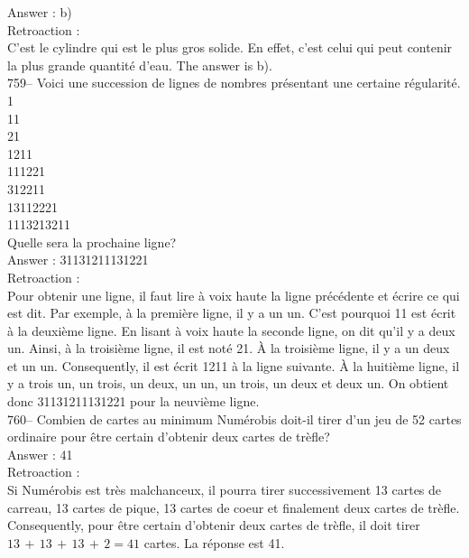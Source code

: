 ﻿\documentclass[letterpaper, 12pt]{article}
\begin{document}
Answer : b)\\

Retroaction : \\
C'est le cylindre qui est le plus gros solide. En effet, c'est celui qui
peut contenir la plus grande quantit\'e d'eau.  The answer is b).\\

759-- Voici une succession de lignes de nombres pr\'esentant une certaine
r\'egularit\'e.  \\
1\\
11\\
21\\
1211\\
111221\\
312211\\
13112221\\
1113213211\\

Quelle sera la prochaine ligne?\\

Answer : 31131211131221\\

Retroaction : \\
Pour obtenir une ligne, il faut lire \`a voix haute la ligne pr\'ec\'edente
et \'ecrire ce qui est dit.  Par exemple, \`a la premi\`ere ligne, il y a un
un.  C'est pourquoi 11 est \'ecrit \`a la deuxi\`eme ligne. En lisant \`a
voix haute la seconde ligne, on dit qu'il y a deux un.  Ainsi, \`a la
troisi\`eme ligne, il est not\'e 21.  \`A la troisi\`eme ligne, il y a un
deux et un un.  Consequently, il est \'ecrit 1211 \`a la ligne suivante.
  \`A la huiti\`eme ligne, il y a trois un, un trois, un deux, un un, un
trois, un deux et deux un. On obtient donc 31131211131221 pour la neuvi\`eme
ligne.\\


760--  Combien de cartes au minimum Num\'erobis doit-il tirer d'un jeu de 52
cartes ordinaire pour \^etre certain d'obtenir deux cartes de tr\`efle?\\

Answer : 41\\

Retroaction : \\
Si Num\'erobis est tr\`es malchanceux, il pourra tirer successivement 13
cartes de carreau, 13 cartes de pique, 13 cartes de coeur et finalement deux
cartes de tr\`efle.  Consequently, pour \^etre certain d'obtenir deux
cartes de tr\`efle, il doit tirer $13\,+\,13\,+\,13\,+\,2=41$ cartes.  La
r\'eponse est 41.\\
\end{document}
